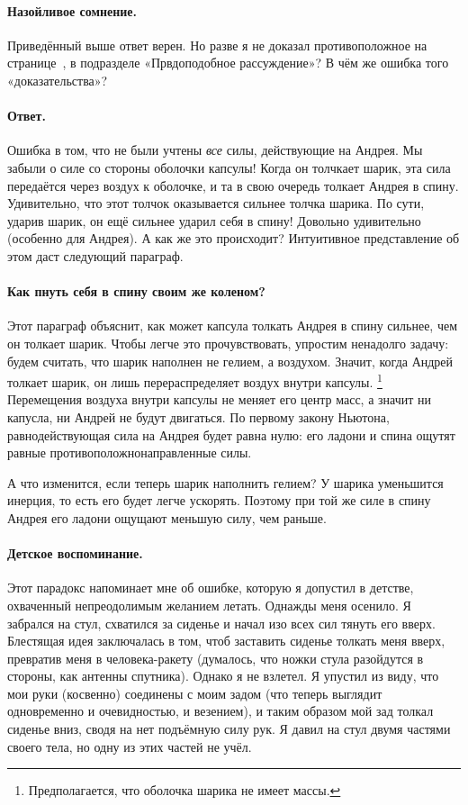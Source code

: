 \paragraph{Назойливое сомнение.}
Приведённый выше ответ верен.
Но разве я не доказал противоположное на странице~\pageref{Првдоподобное рассуждение}, в подразделе «Првдоподобное рассуждение»?
В чём же ошибка того «доказательства»?

\paragraph{Ответ.}
Ошибка в том, что не были учтены \emph{все} силы, действующие на Андрея.
Мы забыли о силе со стороны оболочки капсулы!
Когда он толчкает шарик, эта сила передаётся через воздух к оболочке, и та в свою очередь толкает Андрея в спину.
Удивительно, что этот толчок оказывается сильнее толчка шарика.
По сути, ударив шарик, он ещё сильнее ударил себя в спину!
Довольно удивительно (особенно для Андрея).
А как же это происходит?
Интуитивное представление об этом даст следующий параграф.

\paragraph{Как пнуть себя в спину своим же коленом?}
Этот параграф объяснит, как может капсула толкать Андрея в спину сильнее, чем он толкает шарик.
Чтобы легче это прочувствовать, упростим ненадолго задачу:
будем считать, что шарик наполнен не гелием, а воздухом.
Значит, когда Андрей толкает шарик, он лишь перераспределяет воздух внутри капсулы.%
\footnote{Предполагается, что оболочка шарика не имеет массы.}
Перемещения воздуха внутри капсулы не меняет его центр масс, а значит ни капусла, ни Андрей не будут двигаться.
По первому закону Ньютона, равнодействующая сила на Андрея будет равна нулю: его ладони и спина ощутят равные противоположнонаправленные силы.

А что изменится, если теперь шарик наполнить гелием?
У шарика уменьшится инерция, то есть его будет легче ускорять.
Поэтому при той же силе в спину Андрея его ладони ощущают меньшую силу, чем раньше.

\paragraph{Детское воспоминание.}
Этот парадокс напоминает мне об ошибке, которую я допустил в детстве, охваченный непреодолимым желанием летать.
Однажды меня осенило.
Я забрался на стул, схватился за сиденье и начал изо всех сил тянуть его вверх.
Блестящая идея заключалась в том, чтоб заставить сиденье толкать меня вверх, превратив меня в человека-ракету (думалось, что ножки стула разойдутся в стороны, как антенны спутника).
Однако я не взлетел.
Я упустил из виду, что мои руки (косвенно) соединены с моим задом (что теперь выглядит одновременно и очевидностью, и везением), и таким образом мой зад толкал сиденье вниз, сводя на нет подъёмную силу рук.
Я давил на стул двумя частями своего тела, но одну из этих частей не учёл.

